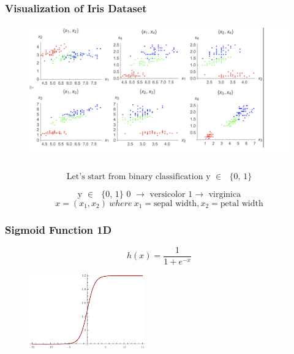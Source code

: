 \documentclass{beamer}
\begin{document}
\begin{frame}
\frametitle{Visualization of Iris Dataset}
\begin{figure}[t]
\includegraphics[scale=0.5]{graphics/feature_vis}
\centering
\end{figure}
\end{frame}

\begin{frame}
\frametitle{}
\[\text{Let's start from binary classification y $\in $ $\{$0, 1$\}$}\]

\[\text{y $\in $ $\{$0, 1$\}$   0 $\to $ versicolor 1$\to $ virginica}\]
\[	
	x = (x_ 1, x_ 2) \
		where \ x_1 = \text{sepal width}, x_2 = \text{petal width}\]
\end{frame}

\begin{frame}
\frametitle{Sigmoid Function 1D}
\[h(x)=\frac{1}{1+e^{-x}}\]
\begin{figure}[t]
\includegraphics[width=5cm]{graphics/1d-sigmoid}
\centering
\end{figure}
\end{frame}
\end{document}
